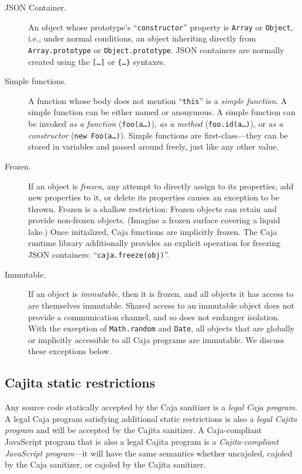 \documentclass[letterpaper,twocolumn,10pt]{article}
\newcommand{\code}[1]{{\tt {#1}}}              %
\begin{document}
\begin{description}

  \item[JSON Container.] An object whose prototype's ``\code{constructor}'' 
  property is \code{Array} or \code{Object}, i.e., under normal conditions, 
  an object inheriting directly from \code{Array.prototype} or 
  \code{Object.prototype}. JSON containers are normally created using the
  \code{[\ldots]} or \code{\{\ldots\}} syntaxes.

  \item[Simple functions.] A function whose body does not mention 
  ``\code{this}'' is a \emph{simple function}. A simple function can be 
  either named or anonymous. A simple function can be invoked \emph{as a 
  function} (\code{foo(a\ldots)}), \emph{as a method} 
  (\code{foo.id(a\ldots)}), or \emph{as a constructor} (\code{new 
  Foo(a\ldots)}). Simple functions are first-class---they can be stored in 
  variables and passed around freely, just like any other value.
  
  \item[Frozen.] If an object is \emph{frozen}, any attempt to directly 
  assign to its properties, add new properties to it, or delete its 
  properties causes an exception to be thrown. Frozen is a shallow 
  restriction: Frozen objects can retain and provide non-frozen objects. 
  (Imagine a frozen surface covering a liquid lake.) Once initialized, Caja 
  functions are implicitly frozen. The Caja runtime library additionally 
  provides an explicit operation for freezing JSON containers: 
  ``\code{caja.freeze(obj)}''.
  
  \item[Immutable.] If an object is \emph{immutable}, then it is frozen, and 
  all objects it has access to are themselves immutable. Shared access to an 
  immutable object does not provide a communication channel, and so does not 
  endanger isolation. With the exception of \code{Math.random} and 
  \code{Date}, all objects that are globally or implicitly accessible to all 
  Caja programs are immutable. We discuss these exceptions below.

\end{description}

\subsection{Cajita static restrictions}

Any source code statically accepted by the Caja sanitizer is a \emph{legal 
Caja program}. A legal Caja program satisfying additional static restrictions 
is also a \emph{legal Cajita program} and will be accepted by the Cajita 
sanitizer. A Caja-compliant JavaScript program that is also a legal Cajita 
program is a \emph{Cajita-compliant JavaScript program}---it will have the 
same semantics whether uncajoled, cajoled by the Caja sanitizer, or cajoled 
by the Cajita sanitizer.
\end{document}
